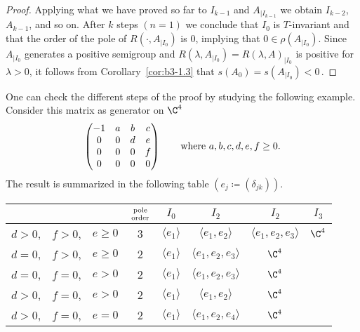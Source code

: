 \begin{proof}
	Applying what we have proved so far to $I_{k-1}$ and $A_{|I_{k-1}}$ we obtain $I_{k-2}$, $A_{k-1}$, and so on.
	After $k$ steps $(n=1)$ we conclude that $I_{0}$ is $T$-invariant and that the order of the pole of $R(\cdot,A_{|I_{0}})$ is $0$, 
	implying that $0 \in \rho(A_{|I_{0}})$.
	Since $A_{|I_{0}}$ generates a positive semigroup and $R(\lambda,A_{|I_{0}}) = R(\lambda,A)_{|I_{0}}$ is positive for $\lambda > 0$, it follows from Corollary~\ref{cor:b3-1.3} that $s(A_{0}) = s(A_{|I_{0}}) < 0$\,.
\end{proof}
One can check the different steps of the proof by studying the following example. 
Consider this matrix as generator on $\C^{4}$
\[
\begin{pmatrix}
	-1 & a & b & c \\
	0 & 0 & d & e \\
	0 & 0 & 0 & f \\
	0 & 0 & 0 & 0
\end{pmatrix}
\quad \quad \text{where $ a,b,c,d,e,f \geq 0 $.} 
\]
The result is summarized in the following table $(e_{j} \coloneqq (\delta_{jk}))$.
\begin{table}[h!]\label{tab:table1}
\begin{center}
% 
\begin{tabular}{lll|c|cccc} %
		 &&& $\text{pole} \atop \text{order}$ & $I_0$ & $I_2$ & $I_2$ & $I_3$ \\[1ex]\hline
		$ d > 0 $, & $ f>0 $, &  $ e \ge 0 $ & 3 & $\langle e_1 \rangle$ &  $\langle e_1, e_2 \rangle$ &  $\langle e_1, e_2, e_3 \rangle$ &  $\C^4$\\
		$ d = 0 $, & $ f > 0 $, & $ e \ge 0 $ & 2 & $\langle e_1 \rangle$ &  $\langle e_1, e_2, e_3 \rangle$ &  $\C^4$ & \\	
		$ d = 0 $, & $ f = 0 $, & $ e > 0 $ & 2 & $\langle e_1 \rangle$ &  $\langle e_1, e_2, e_3 \rangle$ &  $\C^4$ & \\
		$ d > 0 $, & $ f = 0 $, & $ e > 0 $ & 2 & $\langle e_1 \rangle$ &  $\langle e_1, e_2 \rangle$ &  $\C^4$ & \\			
		$ d > 0 $, & $ f = 0 $, & $ e = 0 $ & 2 & $\langle e_1 \rangle$ &  $\langle e_1, e_2, e_4 \rangle$ &  $\C^4$ & \\	
\end{tabular}
\end{center}
\end{table}

